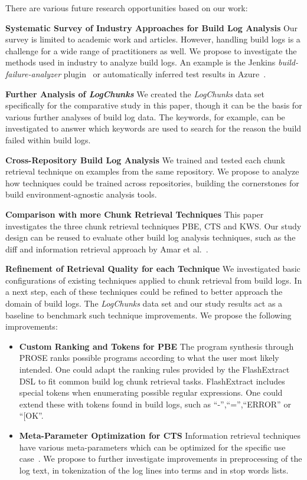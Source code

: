 There are various future research opportunities based on our work:

\textbf{Systematic Survey of Industry Approaches for Build
Log Analysis}
Our survey is limited to academic work and articles.
However, handling build logs is a challenge for a wide range of
practitioners as well.
We propose to investigate the methods used in industry to analyze
build logs.
An example is the Jenkins \emph{build-failure-analyzer}
plugin~\cite{jenkins2020failure-analyzer} or automatically
inferred test results in Azure~\cite{azure2020inferred}.

\textbf{Further Analysis of \emph{LogChunks}}
We created the
\emph{LogChunks} data set \cite{brandt2020logchunks} specifically for
the comparative
study in this paper, though it can be the basis for various further
analyses of build log data.
The keywords, for example, can be
investigated to answer which keywords are used to search for the
reason the build failed within build logs.

\textbf{Cross-Repository Build Log Analysis}
We trained and
tested each chunk retrieval technique on examples from the same
repository.
We propose to analyze how techniques could be trained
across repositories, building the cornerstones for build
environment-agnostic analysis tools.

\textbf{Comparison with more Chunk Retrieval Techniques}
This
paper investigates the three chunk retrieval techniques PBE, CTS and
KWS\@.
Our study design can be reused to evaluate other build log
analysis techniques, such as the diff and information retrieval
approach by Amar et al.~\cite{amar2019mining}.

\textbf{Refinement of Retrieval Quality for each Technique} We
investigated basic configurations of existing techniques applied to
chunk retrieval from build logs.
In a next step, each of these
techniques could be refined to better approach the domain of build
logs.
The \emph{LogChunks} data set and our study results act as a
baseline to benchmark such technique improvements.
We propose the
following improvements:
\begin{itemize}[leftmargin=0.4cm] \itemsep1em
  \item \textbf{Custom Ranking and Tokens for PBE} The program
  synthesis through PROSE ranks possible programs according to
  what the user most likely intended.
  One could adapt the ranking
  rules provided by the FlashExtract DSL to fit common build log
  chunk retrieval tasks.
  FlashExtract includes special tokens when
  enumerating possible regular expressions.
  One could extend these
  with tokens found in build logs, such as ``-'',``='',``ERROR''
  or ``[OK''.
  \item \textbf{Meta-Parameter Optimization for CTS} Information
  retrieval techniques have various meta-parameters which can be
  optimized for the specific use
  case~\cite{panichella2016parameterizing}.
  We propose to further
  investigate improvements in preprocessing of the log text, in
  tokenization of the log lines into terms and in stop words
  lists.
\end{itemize}

